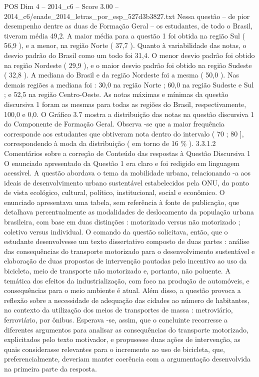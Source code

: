 \begin{textsample}{POS Dim 4 – 2014\_c6 – Score 3.00 – 2014\_c6/enade\_2014\_letras\_por\_esp\_527d3b3827.txt}
Nessa questão – de pior desempenho dentre as duas de Formação Geral – os estudantes, de todo o Brasil, tiveram média 49,2.
A maior média para a questão 1 foi obtida na região Sul ( 56,9 ), e a menor, na região Norte ( 37,7 ).
Quanto à variabilidade das notas, o desvio padrão do Brasil como um todo foi 31,4.
O menor desvio padrão foi obtido na região Nordeste ( 29,9 ), e o maior desvio padrão foi obtido na região Sudeste ( 32,8 ).
A mediana do Brasil e da região Nordeste foi a mesma ( 50,0 ).
Nas demais regiões a mediana foi : 30,0 na região Norte ; 60,0 na região Sudeste e Sul ; e 52,5 na região Centro-Oeste.
As notas máximas e mínimas da questão discursiva 1 foram as mesmas para todas as regiões do Brasil, respectivamente, 100,0 e 0,0.
O Gráfico 3.7 mostra a distribuição das notas na questão discursiva 1 do Componente de Formação Geral.
Observa -se que a maior frequência corresponde aos estudantes que obtiveram nota dentro do intervalo ( 70 ; 80 ], correspondendo à moda da distribuição ( em torno de 16 \% ). 3.3.1.2 Comentários sobre a correção de Conteúdo das respostas à Questão Discursiva 1 O enunciado apresentado da Questão 1 era claro e foi redigido em linguagem acessível.
A questão abordava o tema da mobilidade urbana, relacionando -a aos ideais de desenvolvimento urbano sustentável estabelecidos pela ONU, do ponto de vista ecológico, cultural, político, institucional, social e econômico.
O enunciado apresentava uma tabela, sem referência à fonte de publicação, que detalhava percentualmente as modalidades de deslocamento da população urbana brasileira, com base em duas distinções : motorizado versus não motorizado ; coletivo versus individual.
O comando da questão solicitava, então, que o estudante desenvolvesse um texto dissertativo composto de duas partes : análise das consequências do transporte motorizado para o desenvolvimento sustentável e elaboração de duas propostas de intervenção pautadas pelo incentivo ao uso da bicicleta, meio de transporte não motorizado e, portanto, não poluente.
A temática dos efeitos da industrialização, com foco na produção de automóveis, e consequências para o meio ambiente é atual.
Além disso, a questão provoca a reflexão sobre a necessidade de adequação das cidades ao número de habitantes, no contexto da utilização dos meios de transportes de massa : metroviário, ferroviário, por ônibus.
Esperava -se, assim, que o concluinte recorresse a diferentes argumentos para analisar as consequências do transporte motorizado, explicitados pelo texto motivador, e propusesse duas ações de intervenção, as quais considerasse relevantes para o incremento ao uso de bicicleta, que, preferencialmente, deveriam manter coerência com a argumentação desenvolvida na primeira parte da resposta.

\end{textsample}
